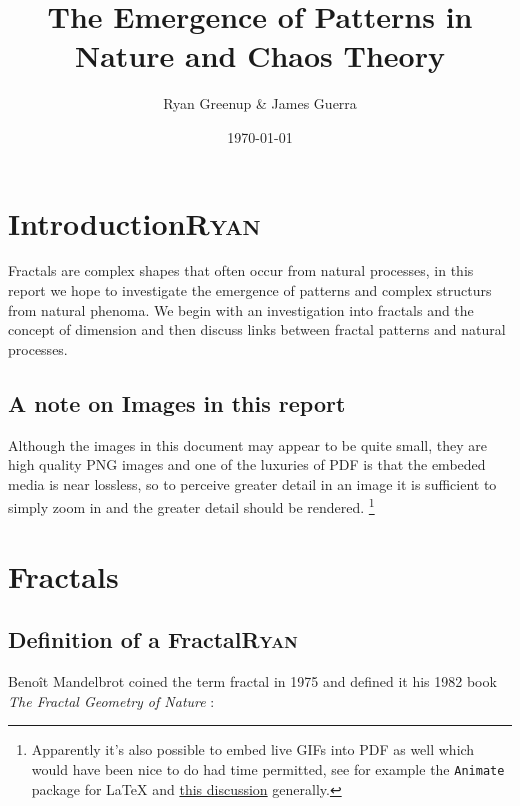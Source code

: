 \documentclass[a4paper,11pt,twoside]{article}
\author{Ryan Greenup \& James Guerra}
\date{\today}
\title{The Emergence of Patterns in Nature and Chaos Theory}
\begin{document}
\maketitle
\tableofcontents

 \newpage 
\section{Introduction\hfill{}\textsc{Ryan}}
\label{sec:org984c899}
Fractals are complex shapes that often occur from natural processes, in this
report we hope to investigate the emergence of patterns and complex structurs
from natural phenoma. We begin with an investigation into fractals and the
concept of dimension and then discuss links between fractal patterns and natural
processes.

\subsection{A note on Images in this report}
\label{sec:org7c3b892}
Although the images in this document may appear to be quite small, they are high quality PNG images and one of the luxuries of PDF is that the embeded media is near lossless, so to perceive greater detail in an image it is sufficient to simply zoom in and the greater detail should be rendered. \footnote{Apparently it's also possible to embed live GIFs into PDF as well which would have been nice to do had time permitted, see for example the \texttt{Animate} package for \LaTeX \cite{CTANPackageAnimate} and \href{https://tex.stackexchange.com/questions/5396/is-there-any-way-to-include-an-animated-gif-directly}{this discussion} \cite{PdftexThereAny} generally.}

\section{Fractals}
\label{sec:orgf75516d}
\subsection{Definition of a Fractal\hfill{}\textsc{Ryan}}
\label{sec:org74eecc8}

Benoît Mandelbrot coined the term fractal in 1975 \cite{gomoryBenoitMandelbrot19242010} and defined it his 1982 book \emph{The Fractal Geometry of Nature} \cite[p. 15]{mandelbrotFractalGeometryNature1982} :
\end{document}

